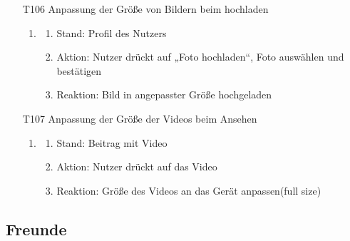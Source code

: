 \documentclass[parskip=full]{scrartcl}
\begin{document}
\begin{itemize}
		\item[T106] Anpassung der Größe von Bildern beim hochladen
		\begin{enumerate}
			\item
			\begin{enumerate}[nosep]	
				\item Stand:  Profil des Nutzers
				\item Aktion: Nutzer  drückt auf „Foto hochladen“, Foto auswählen und bestätigen
				\item Reaktion: Bild in angepasster Größe hochgeladen
			\end{enumerate} 
		\end{enumerate}
		
		\item[T107] Anpassung der Größe der Videos beim Ansehen
		\begin{enumerate}
			\item
			\begin{enumerate}[nosep]	
				\item Stand:  Beitrag mit Video
				\item Aktion: Nutzer  drückt auf das Video
				\item Reaktion: Größe des Videos an das Gerät anpassen(full size)
			\end{enumerate} 
		\end{enumerate}
		
	\end{itemize}
	
	\subsection{Freunde}
	
\end{document}
